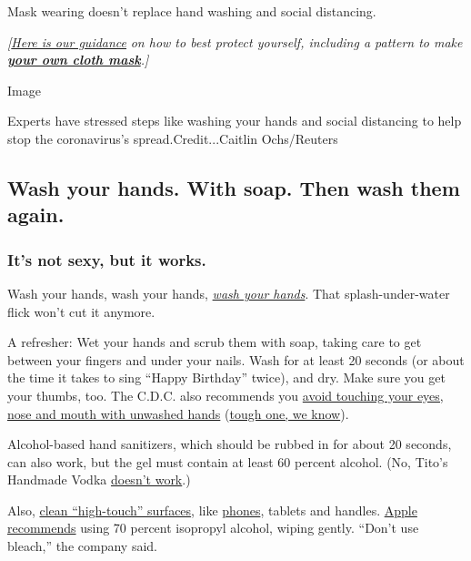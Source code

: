 Mask wearing doesn't replace hand washing and social distancing.

\emph{{[}}\href{https://www.nytimes3xbfgragh.onion/article/coronavirus-N95-mask-DIY-face-mask-health.html}{\emph{Here
is our guidance}} \emph{on how to best protect yourself, including a
pattern to make}
\textbf{\href{https://www.nytimes3xbfgragh.onion/article/how-to-make-face-mask-coronavirus.html}{\emph{your
own cloth mask}}}\emph{.{]}}

Image

Experts have stressed steps like washing your hands and social
distancing to help stop the coronavirus's spread.Credit...Caitlin
Ochs/Reuters

\hypertarget{wash-your-hands-with-soap-then-wash-them-again}{%
\subsection{Wash your hands. With soap. Then wash them
again.}\label{wash-your-hands-with-soap-then-wash-them-again}}

\hypertarget{its-not-sexy-but-it-works}{%
\subsubsection{It's not sexy, but it
works.}\label{its-not-sexy-but-it-works}}

Wash your hands, wash your hands,
\href{https://www.nytimes3xbfgragh.onion/2020/03/13/world/how-to-wash-your-hands-coronavirus.html}{\emph{wash
your hands}}. That splash-under-water flick won't cut it anymore.

A refresher: Wet your hands and scrub them with soap, taking care to get
between your fingers and under your nails. Wash for at least 20 seconds
(or about the time it takes to sing ``Happy Birthday'' twice), and dry.
Make sure you get your thumbs, too. The C.D.C. also recommends you
\href{https://www.cdc.gov/coronavirus/2019-ncov/hcp/guidance-prevent-spread.html}{avoid
touching your eyes, nose and mouth with unwashed hands}
(\href{https://www.nytimes3xbfgragh.onion/2020/03/05/health/stop-touching-your-face-coronavirus.html}{tough
one, we know}).

Alcohol-based hand sanitizers, which should be rubbed in for about 20
seconds, can also work, but the gel must contain at least 60 percent
alcohol. (No, Tito's Handmade Vodka
\href{https://www.cnn.com/2020/03/05/us/titos-vodka-coronavirus-trnd/index.html}{doesn't
work}.)

Also,
\href{https://www.cdc.gov/coronavirus/2019-ncov/hcp/guidance-prevent-spread.html}{clean
``high-touch'' surfaces}, like
\href{https://www.nytimes3xbfgragh.onion/2020/03/12/smarter-living/clean-your-phone.html}{phones},
tablets and handles.
\href{https://support.apple.com/en-us/HT204172?mod=article_inline}{Apple
recommends} using 70 percent isopropyl alcohol, wiping gently. ``Don't
use bleach,'' the company said.

